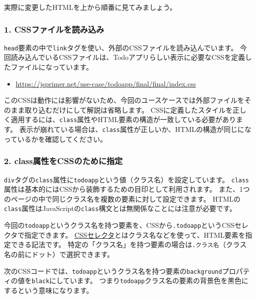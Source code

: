 実際に変更したHTMLを上から順番に見てみましょう。

\hypertarget{comment-css-file-load}{%
\subsubsection{1. CSSファイルを読み込み}\label{comment-css-file-load}}

\texttt{head}要素の中で\texttt{link}タグを使い、外部のCSSファイルを読み込んでいます。
今回読み込んでいるCSSファイルは、Todoアプリらしい表示に必要なCSSを定義したファイルになっています。

\begin{itemize}
\item
  \url{https://jsprimer.net/use-case/todoapp/final/final/index.css}
\end{itemize}

このCSSは動作には影響がないため、今回のユースケースでは外部ファイルをそのまま取り込むだけにして解説は省略します。
CSSに定義したスタイルを正しく適用するには、\texttt{class}属性やHTML要素の構造が一致している必要があります。
表示が崩れている場合は、\texttt{class}属性が正しいか、HTMLの構造が同じになっているかを確認してください。

\hypertarget{comment-class-for-css}{%
\subsubsection{2. class属性をCSSのために指定}\label{comment-class-for-css}}

\texttt{div}タグの\texttt{class}属性に\texttt{todoapp}という値（クラス名）を設定しています。
\texttt{class}属性は基本的にはCSSから装飾するための目印として利用されます。
また、1つのページの中で同じクラス名を複数の要素に対して設定できます。
HTMLの\texttt{class}属性はJavaScriptの\texttt{class}構文とは無関係なことには注意が必要です。

今回の\texttt{todoapp}というクラス名を持つ要素を、CSSから\texttt{.todoapp}というCSSセレクタで指定できます。
\href{https://developer.mozilla.org/ja/docs/Learn/CSS/Building_blocks/Selectors}{CSSセレクタ}とはクラス名などを使って、HTML要素を指定できる記法です。
特定の「クラス名」を持つ要素の場合は\texttt{.\hbox{}クラス名}（クラス名の前にドット）で選択できます。

次のCSSコードでは、\texttt{todoapp}というクラス名を持つ要素の\texttt{background}プロパティの値を\texttt{black}にしています。
つまり\texttt{todoapp}クラス名の要素の背景色を黒色にするという意味になります。

